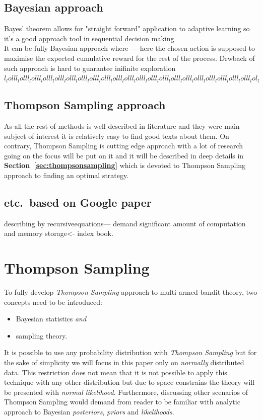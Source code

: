 \documentclass[12pt, a4paper, pdflatex, leqno]{report}
\begin{document}
\subsection{Bayesian approach}
Bayes' theorem allows for "straight forward" application to adaptive learning so it's a good approach tool in sequential decision making \\

It can be fully Bayesian approach where --- here the chosen action is supposed to maximise the expected cumulative reward for the rest of the process. Drwback of such approach is hard to guarantee inifinite exploration
$l_lo lll_lo lll_lo lll_lo lll_lo lll_lo lll_lo lll_lo lll_lo lll_lo lll_lo lll_lo lll_lo lll_lo lll_lo lll_lo lll_lo lll_lo lll_lo lll_lo lll_lo lll_lo l_l$

\subsection{Thompson Sampling approach}
As all the rest of methods is well described in literature and they were main subject of interest it is relatively easy to find good texts about them. On contrary, Thompson Sampling is cutting edge approach with a lot of research going on the focus will be put on it and it will be described in deep details in  \textbf{Section~\ref{sec:thompsonsampling}} which is devoted to Thompson Sampling approach to finding an optimal strategy.

\subsection{etc.\ based on Google paper}

describing by recursiveequations--- demand significant amount of computation and memory storage<- index book.


\section{Thompson Sampling\label{sec:thompsonsampling}}
To fully develop \emph{Thompson Sampling} approach to multi-armed bandit theory, two concepts need to be introduced:
\begin{itemize}
\item Bayesian statistics \emph{and}
\item sampling theory.
\end{itemize}
It is possible to use any probability distribution with \emph{Thompson Sampling} but for the sake of simplicity we will focus in this paper only on \emph{normally} distributed data. This restriction does not mean that it is not possible to apply this technique with any other distribution but due to space constrains the theory will be presented with \emph{normal likelihood}. Furthermore, discussing other scenarios of Thompson Sampling would demand from reader to be familiar with analytic approach to Bayesian \emph{posteriors}, \emph{priors} and \emph{likelihoods}.
\end{document}

